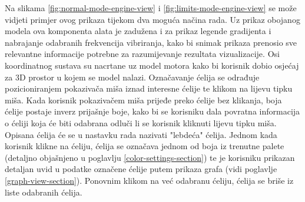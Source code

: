 \documentclass[times, utf8, diplomski]{fer}
\begin{document}
Na slikama \ref{fig:normal-mode-engine-view} i \ref{fig:limits-mode-engine-view} se može vidjeti primjer ovog prikaza tijekom dva moguća načina rada. Uz prikaz obojanog modela ova komponenta alata je zadužena i za prikaz legende gradijenta i nabrajanje odabranih frekvencija vibriranja, kako bi snimak prikaza prenosio sve relevantne informacije potrebne za razumijevanje rezultata vizualizacije. Osi koordinatnog sustava su nacrtane uz model motora kako bi korisnik dobio osjećaj za 3D prostor u kojem se model nalazi. Označavanje ćelija se odrađuje pozicioniranjem pokazivača miša iznad interesne ćelije te klikom na lijevu tipku miša. Kada korisnik pokazivačem miša prijeđe preko ćelije bez klikanja, boja ćelije postaje inverz prijašnje boje, kako bi se korisniku dala povratna informacija o ćeliji koja će biti odabrana odluči li se korisnik kliknuti lijevu tipku miša. Opisana ćelija će se u nastavku rada nazivati "lebdeća" ćelija. Jednom kada korisnik klikne na ćeliju, ćelija se označava jednom od boja iz trenutne palete (detaljno objašnjeno u poglavlju \ref{color-settings-section}) te je korisniku prikazan detaljan uvid u podatke označene ćelije putem prikaza grafa (vidi poglavlje \ref{graph-view-section}). Ponovnim klikom na već odabranu ćeliju, ćelija se briše iz liste odabranih ćelija.\\
\end{document}
